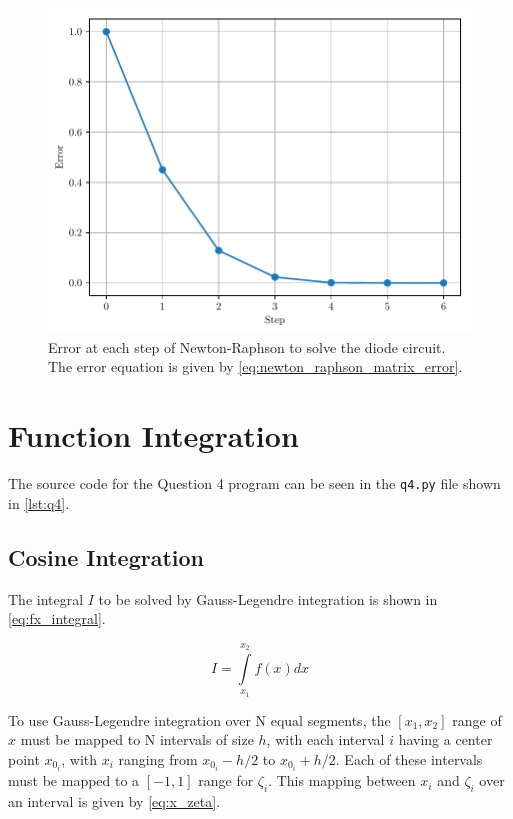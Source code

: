 \documentclass[a4paper,titlepage]{article}
\begin{document}
	\begin{figure}[!htb]
		\centering
		\includegraphics[width=\columnwidth]{plots/q3.pdf}
		\caption{Error at each step of Newton-Raphson to solve the diode circuit. The error equation is given by \cref{eq:newton_raphson_matrix_error}.}
		\label{fig:q3}
	\end{figure}

	
	\section{Function Integration}
	The source code for the Question 4 program can be seen in the \texttt{q4.py} file shown in \cref{lst:q4}.
	
	\subsection{Cosine Integration}
	
	The integral $I$ to be solved by Gauss-Legendre integration is shown in \cref{eq:fx_integral}.
	
	\begin{equation} \label{eq:fx_integral}
		I = \int\limits_{x_1}^{x_2} f(x) dx 
	\end{equation}
	
	To use Gauss-Legendre integration over N equal segments, the $[x_1, x_2]$ range of $x$ must be mapped to N intervals of size $h$, with each interval $i$ having a center point $x_{0_i}$, with $x_i$ ranging from $x_{0_i} - h/2$ to $x_{0_i} + h/2$. Each of these intervals must be mapped to a $[-1, 1]$ range for $\zeta_i$. This mapping between $x_i$ and $\zeta_i$ over an interval is given by \cref{eq:x_zeta}.
	
\end{document}
